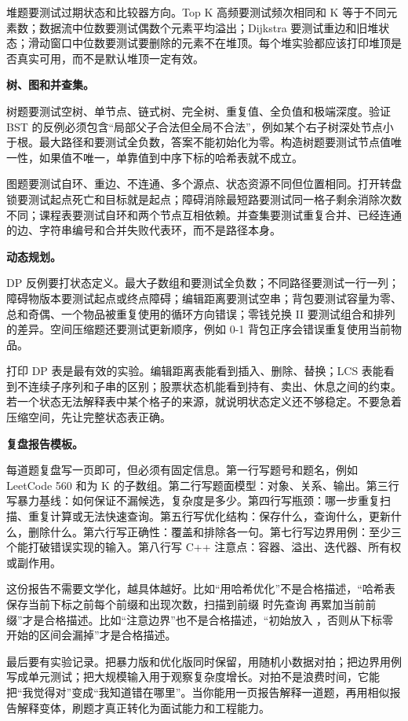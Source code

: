 堆题要测试过期状态和比较器方向。Top K 高频要测试频次相同和 K 等于不同元素数；数据流中位数要测试偶数个元素平均溢出；Dijkstra 要测试重边和旧堆状态；滑动窗口中位数要测试要删除的元素不在堆顶。每个堆实验都应该打印堆顶是否真实可用，而不是默认堆顶一定有效。

\noindent\textbf{树、图和并查集。}

树题要测试空树、单节点、链式树、完全树、重复值、全负值和极端深度。验证 BST 的反例必须包含“局部父子合法但全局不合法”，例如某个右子树深处节点小于根。最大路径和要测试全负数，答案不能初始化为零。构造树题要测试节点值唯一性，如果值不唯一，单靠值到中序下标的哈希表就不成立。

图题要测试自环、重边、不连通、多个源点、状态资源不同但位置相同。打开转盘锁要测试起点死亡和目标就是起点；障碍消除最短路要测试同一格子剩余消除次数不同；课程表要测试自环和两个节点互相依赖。并查集要测试重复合并、已经连通的边、字符串编号和合并失败代表环，而不是路径本身。

\noindent\textbf{动态规划。}

DP 反例要打状态定义。最大子数组和要测试全负数；不同路径要测试一行一列；障碍物版本要测试起点或终点障碍；编辑距离要测试空串；背包要测试容量为零、总和奇偶、一个物品被重复使用的循环方向错误；零钱兑换 II 要测试组合和排列的差异。空间压缩题还要测试更新顺序，例如 0-1 背包正序会错误重复使用当前物品。

打印 DP 表是最有效的实验。编辑距离表能看到插入、删除、替换；LCS 表能看到不连续子序列和子串的区别；股票状态机能看到持有、卖出、休息之间的约束。若一个状态无法解释表中某个格子的来源，就说明状态定义还不够稳定。不要急着压缩空间，先让完整状态表正确。

\noindent\textbf{复盘报告模板。}

每道题复盘写一页即可，但必须有固定信息。第一行写题号和题名，例如 LeetCode 560 和为 K 的子数组。第二行写题面模型：对象、关系、输出。第三行写暴力基线：如何保证不漏候选，复杂度是多少。第四行写瓶颈：哪一步重复扫描、重复计算或无法快速查询。第五行写优化结构：保存什么，查询什么，更新什么，删除什么。第六行写正确性：覆盖和排除各一句。第七行写边界用例：至少三个能打破错误实现的输入。第八行写 C++ 注意点：容器、溢出、迭代器、所有权或副作用。

这份报告不需要文学化，越具体越好。比如“用哈希优化”不是合格描述，“哈希表保存当前下标之前每个前缀和出现次数，扫描到前缀  时先查询  再累加当前前缀”才是合格描述。比如“注意边界”也不是合格描述，“初始放入 ，否则从下标零开始的区间会漏掉”才是合格描述。

最后要有实验记录。把暴力版和优化版同时保留，用随机小数据对拍；把边界用例写成单元测试；把大规模输入用于观察复杂度增长。对拍不是浪费时间，它能把“我觉得对”变成“我知道错在哪里”。当你能用一页报告解释一道题，再用相似报告解释变体，刷题才真正转化为面试能力和工程能力。


